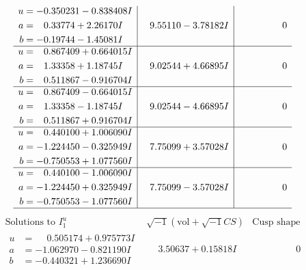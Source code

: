 \documentclass[1p]{elsarticle_modified}
\theoremstyle{definition}
\newcommand{\I}{\sqrt{-1}}
\begin{document}
$$\begin{array}{c|c|c}
\begin{aligned}
u &= -0.350231 - 0.838408 I \\
a &= \phantom{-}0.33774 + 2.26170 I \\
b &= -0.19744 - 1.45081 I\end{aligned}
 & \phantom{-}9.55110 - 3.78182 I & \phantom{-0.000000 } 0 \\ \hline\begin{aligned}
u &= \phantom{-}0.867409 + 0.664015 I \\
a &= \phantom{-}1.33358 + 1.18745 I \\
b &= \phantom{-}0.511867 - 0.916704 I\end{aligned}
 & \phantom{-}9.02544 + 4.66895 I & \phantom{-0.000000 } 0 \\ \hline\begin{aligned}
u &= \phantom{-}0.867409 - 0.664015 I \\
a &= \phantom{-}1.33358 - 1.18745 I \\
b &= \phantom{-}0.511867 + 0.916704 I\end{aligned}
 & \phantom{-}9.02544 - 4.66895 I & \phantom{-0.000000 } 0 \\ \hline\begin{aligned}
u &= \phantom{-}0.440100 + 1.006090 I \\
a &= -1.224450 - 0.325949 I \\
b &= -0.750553 + 1.077560 I\end{aligned}
 & \phantom{-}7.75099 + 3.57028 I & \phantom{-0.000000 } 0 \\ \hline\begin{aligned}
u &= \phantom{-}0.440100 - 1.006090 I \\
a &= -1.224450 + 0.325949 I \\
b &= -0.750553 - 1.077560 I\end{aligned}
 & \phantom{-}7.75099 - 3.57028 I & \phantom{-0.000000 } 0\\
 \hline 
 \end{array}$$\newpage$$\begin{array}{c|c|c}  
\text{Solutions to }I^u_{1}& \I (\text{vol} + \sqrt{-1}CS) & \text{Cusp shape}\\
 \hline 
\begin{aligned}
u &= \phantom{-}0.505174 + 0.975773 I \\
a &= -1.062970 - 0.821190 I \\
b &= -0.440321 + 1.236690 I\end{aligned}
 & \phantom{-}3.50637 + 0.15818 I & \phantom{-0.000000 } 0 \\ \hline\begin{aligned}

\end{aligned}
\end{array}$$
\end{document}
